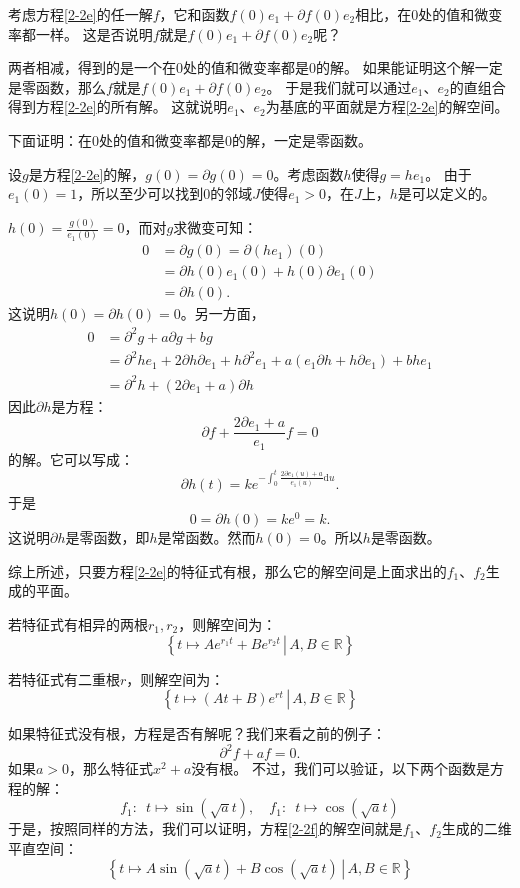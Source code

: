 \documentclass[12pt,UTF8]{ctexbook}
\theoremstyle{definition}
\theoremstyle{plain}
\begin{document}
考虑方程\eqref{2-2e}的任一解$f$，它和函数$f(0)e_1 + \partial f(0) e_2$相比，在$0$处的值和微变率都一样。
这是否说明$f$就是$f(0)e_1 + \partial f(0) e_2$呢？

两者相减，得到的是一个在$0$处的值和微变率都是$0$的解。
如果能证明这个解一定是零函数，那么$f$就是$f(0)e_1 + \partial f(0) e_2$。
于是我们就可以通过$e_1$、$e_2$的直组合得到方程\eqref{2-2e}的所有解。
这就说明$e_1$、$e_2$为基底的平面就是方程\eqref{2-2e}的解空间。

下面证明：在$0$处的值和微变率都是$0$的解，一定是零函数。

设$g$是方程\eqref{2-2e}的解，$g(0) = \partial g(0) = 0$。考虑函数$h$使得$g = he_1$。
由于$e_1(0) = 1$，所以至少可以找到$0$的邻域$J$使得$e_1 > 0$，在$J$上，$h$是可以定义的。

$h(0) = \frac{g(0)}{e_1(0)} = 0$，而对$g$求微变可知：
\begin{align*}
    0 &= \partial g(0) = \partial (he_1) (0) \\
    &= \partial h (0) e_1(0) + h (0) \partial e_1(0) \\
    &= \partial h (0).
\end{align*}
这说明$h(0) = \partial h(0) = 0$。另一方面，
\begin{align*}
    0 &= \partial^2 g + a \partial g + b g \\
    &= \partial^2 h e_1 + 2 \partial h \partial e_1 + h \partial^2 e_1 + a(e_1\partial h + h \partial e_1) + b h e_1 \\
    &= \partial^2 h  + (2 \partial e_1 + a) \partial h
\end{align*}
因此$\partial h$是方程：
$$ \partial f + \frac{2 \partial e_1 + a}{e_1} f = 0 $$
的解。它可以写成：
$$ \partial h (t) = k e^{-\int_0^t \frac{2 \partial e_1(u) + a}{e_1(u)} \mathrm{d}u}. $$
于是
$$0 = \partial h (0) = k e^0 = k.$$
这说明$\partial h$是零函数，即$h$是常函数。然而$h(0) = 0$。所以$h$是零函数。

综上所述，只要方程\eqref{2-2e}的特征式有根，那么它的解空间是上面求出的$f_1$、$f_2$生成的平面。

若特征式有相异的两根$r_1, r_2$，则解空间为：
$$ \left\{\left.t \mapsto Ae^{r_1t} + Be^{r_2t}\,\right|\, A, B \in \mathbb{R}\right\}$$

若特征式有二重根$r$，则解空间为：
$$ \left\{\left.t \mapsto (At + B)e^{rt}\,\right|\, A, B \in \mathbb{R}\right\}$$

如果特征式没有根，方程是否有解呢？我们来看之前的例子：
\begin{equation}
    \partial^2 f + af = 0. \label{2-2f}
\end{equation}
如果$a>0$，那么特征式$x^2 + a$没有根。
不过，我们可以验证，以下两个函数是方程的解：
$$ f_1: \,\,\, t\mapsto \sin{(\sqrt{a}t)}, \quad f_1: \,\,\, t\mapsto \cos{(\sqrt{a}t)} $$
于是，按照同样的方法，我们可以证明，方程\eqref{2-2f}的解空间就是$f_1$、$f_2$生成的二维平直空间：
$$ \left\{\left.t \mapsto A\sin{(\sqrt{a}t)} + B\cos{(\sqrt{a}t)}\,\right|\, A, B \in \mathbb{R}\right\}$$
\end{document}
